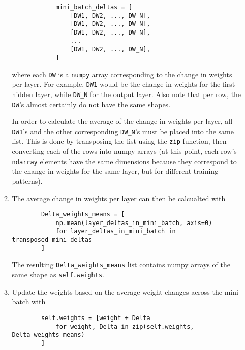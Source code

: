 \documentclass{article} %
\theoremstyle{definition}
\theoremstyle{remark}
\theoremstyle{plain}
\begin{document}
\begin{enumerate}
\begin{enumerate}
        \begin{verbatim}
            mini_batch_deltas = [
                [DW1, DW2, ..., DW_N],
                [DW1, DW2, ..., DW_N],
                [DW1, DW2, ..., DW_N],
                ...
                [DW1, DW2, ..., DW_N],
            ]
        \end{verbatim}
        where each \verb|DW| is a \verb|numpy| array corresponding to the change in weights per layer. For example, \verb|DW1| would be the change in weights for the first hidden layer, while \verb|DW_N| for the output layer. Also note that per row, the \verb|DW|'s almost certainly do not have the same shapes.

        In order to calculate the average of the change in weights per layer, all \verb|DW1|'s and the other corresponding \verb|DW_N|'s must be placed into the same list. This is done by transposing the list using the \verb|zip| function, then converting each of the rows into numpy arrays (at this point, each row's \verb|ndarray| elements have the same dimensions because they correspond to the change in weights for the same layer, but for different training patterns). 
        
        \item The average change in weights per layer can then be calcualted with
        \begin{verbatim}
        Delta_weights_means = [
            np.mean(layer_deltas_in_mini_batch, axis=0)
            for layer_deltas_in_mini_batch in transposed_mini_deltas
        ]
        \end{verbatim}
        The resulting \verb|Delta_weights_means| list contains numpy arrays of the same shape as \verb|self.weights|.
        \item Update the weights based on the average weight changes across the mini-batch with
        \begin{verbatim}
        self.weights = [weight + Delta 
            for weight, Delta in zip(self.weights, Delta_weights_means)
        ]
        \end{verbatim}
    \end{enumerate}
\end{enumerate}
\end{document}

